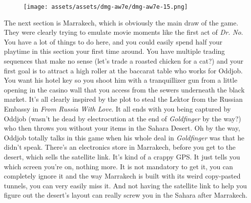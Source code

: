 \documentclass{book}
\begin{document}
\begin{figure}[hbt]
\vskip 10pt
\centering \texttt{[image: assets/assets/dmg-aw7e/dmg-aw7e-15.png]}
\vskip 6pt
\end{figure}
The next section is Marrakech, which is obviously the main draw of the game. They were clearly trying to emulate movie moments like the first act of \emph{Dr. No}. You have a lot of things to do here, and you could easily spend half your playtime in this section your first time around. You have multiple trading sequences that make no sense (let’s trade a roasted chicken for a cat?) and your first goal is to attract a high roller at the baccarat table who works for Oddjob. You want his hotel key so you shoot him with a tranquillizer gun from a little opening in the casino wall that you access from the sewers underneath the black market. It’s all clearly inspired by the plot to steal the Lektor from the Russian Embassy in \emph{From Russia With Love}. It all ends with you being captured by Oddjob (wasn’t he dead by electrocution at the end of \emph{Goldfinger} by the way?) who then throws you without your items in the Sahara Desert. Oh by the way, Oddjob totally talks in this game when his whole deal in \emph{Goldfinger} was that he didn’t speak. There’s an electronics store in Marrakech, before you get to the desert, which sells the satellite link. It’s kind of a crappy GPS. It just tells you which screen you’re on, nothing more. It is not mandatory to get it, you can completely ignore it and the way Marrakech is built with its weird copy-pasted tunnels, you can very easily miss it. And not having the satellite link to help you figure out the desert’s layout can really screw you in the Sahara after Marrakech.
\end{document}
